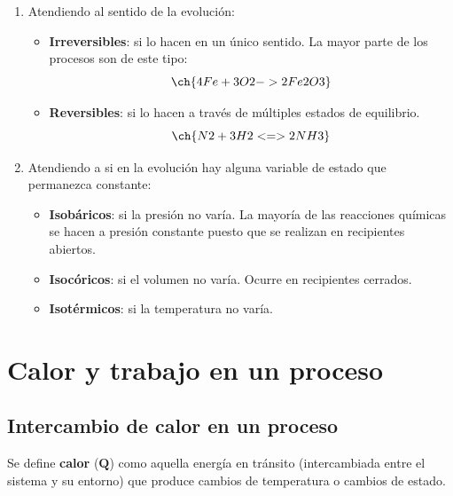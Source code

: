 \begin{enumerate}[label=\numberballmDarkTeal]
        \item Atendiendo al sentido de la evolución:
        \begin{itemize}
            \item \textbf{Irreversibles}: si lo hacen en un único sentido.
            La mayor parte de los procesos son de este tipo:
            \begin{equation*}
                \ch{4 Fe + 3 O2 -> 2 Fe2O3}
            \end{equation*}
            \item \textbf{Reversibles}: si lo hacen a través de múltiples estados de equilibrio.
            \begin{equation*}
                \ch{N2 + 3 H2 <=> 2 NH3}
            \end{equation*}
        \end{itemize}
        \item Atendiendo a si en la evolución hay alguna variable de estado que permanezca constante:
        \begin{itemize}
            \item \textbf{Isobáricos}: si la presión no varía.
            La mayoría de las reacciones químicas se hacen a presión constante puesto que se realizan en recipientes abiertos.
            \item \textbf{Isocóricos}: si el volumen no varía.
            Ocurre en recipientes cerrados.
            \item \textbf{Isotérmicos}: si la temperatura no varía.
        \end{itemize}
\end{enumerate}


\section{Calor y trabajo en un proceso}\label{sec:calor-y-trabajo-en-un-proceso}

\subsection{Intercambio de calor en un proceso}\label{subsec:intercambio-de-calor-en-un-proceso}


\begin{definition}[Calor]
    Se define \textbf{calor} (\(\bm{Q}\)) como aquella energía en tránsito (intercambiada entre el sistema y su entorno) que produce cambios de temperatura o cambios de estado.
\end{definition}



